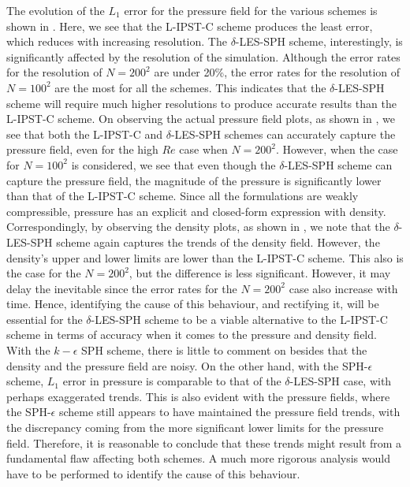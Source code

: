 The evolution of the $L_1$ error for the pressure field for the various schemes is shown in .
Here, we see that the L-IPST-C scheme produces the least error, which reduces with increasing resolution.
The $\delta$-LES-SPH scheme, interestingly, is significantly affected by the resolution of the simulation. Although the error rates for the resolution of $N=200^2$ are under 20\%, the error rates for the resolution of $N=100^2$ are the most for all the schemes. This indicates that the $\delta$-LES-SPH scheme will require much higher resolutions to produce accurate results than the L-IPST-C scheme.
On observing the actual pressure field plots, as shown in , we see that both the L-IPST-C and $\delta$-LES-SPH schemes can accurately capture the pressure field, even for the high $Re$ case when $N=200^2$. However, when the case for $N=100^2$ is considered, we see that even though the $\delta$-LES-SPH scheme can capture the pressure field, the magnitude of the pressure is significantly lower than that of the L-IPST-C scheme.
Since all the formulations are weakly compressible, pressure has an explicit and closed-form expression with density.
Correspondingly, by observing the density plots, as shown in , we note that the $\delta$-LES-SPH scheme again captures the trends of the density field. However, the density's upper and lower limits are lower than the L-IPST-C scheme.
This also is the case for the $N=200^2$, but the difference is less significant. However, it may delay the inevitable since the error rates for the $ N=200^2 $ case also increase with time. Hence, identifying the cause of this behaviour, and rectifying it, will be essential for the $\delta$-LES-SPH scheme to be a viable alternative to the L-IPST-C scheme in terms of accuracy when it comes to the pressure and density field.
With the $k-\epsilon$ SPH scheme, there is little to comment on besides that the density and the pressure field are noisy.
On the other hand, with the SPH-$\epsilon$ scheme, $L_1$ error in pressure is comparable to that of the $\delta$-LES-SPH case, with perhaps exaggerated trends. This is also evident with the pressure fields, where the SPH-$\epsilon$ scheme still appears to have maintained the pressure field trends, with the discrepancy coming from the more significant lower limits for the pressure field.
Therefore, it is reasonable to conclude that these trends might result from a fundamental flaw affecting both schemes. A much more rigorous analysis would have to be performed to identify the cause of this behaviour.

